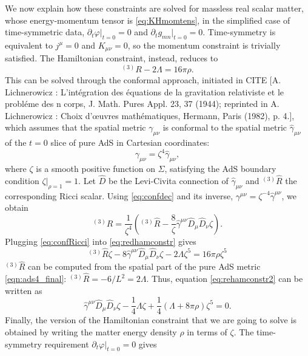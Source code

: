 \documentclass[a4paper,11pt]{article}
\numberwithin{equation}{section}
\begin{document}
We now explain how these constraints are solved for massless real scalar matter, whose energy-momentum tensor is \eqref{eq:KHmomtens}, in the simplified case of time-symmetric data, $\partial_t \varphi|_{t=0}=0$ and $\partial_t g_{mn}|_{t=0}=0$. Time-symmetry is equivalent to $j^\mu=0$ and $K_{\mu\nu}=0$, so the momentum constraint is trivially satisfied.
The Hamiltonian constraint, instead, reduces to
\begin{equation}
\label{eq:redhamconstr}
^{(3)}R-2\Lambda=16\pi\rho.
\end{equation}
This can be solved through the conformal approach, initiated in CITE [A. Lichnerowicz : L’int\'{e}gration des \'{e}quations de la gravitation relativiste et le probl\'{e}me des n corps, J. Math. Pures Appl. 23, 37 (1944); reprinted in A. Lichnerowicz : Choix d’œuvres math\'{e}matiques, Hermann, Paris (1982), p. 4.], which assumes that the spatial metric $\gamma_{\mu\nu}$ is conformal to the spatial metric $\hat{\gamma}_{\mu\nu}$ of the $t=0$ slice of pure AdS in Cartesian coordinates:
\begin{equation}
\label{eq:confdec}
\gamma_{\mu\nu}=\zeta^4 \hat{\gamma}_{\mu\nu},
\end{equation}
where $\zeta$ is a smooth positive function on $\Sigma$, satisfying the AdS boundary condition $\zeta|_{\rho=1}=1$. Let $\hat{D}$ be the Levi-Civita connection of $\hat{\gamma}_{\mu\nu}$ and $^{(3)}\hat{R}$ the corresponding Ricci scalar. Using  \eqref{eq:confdec} and its inverse, $\gamma^{\mu\nu}=\zeta^{-4} \hat{\gamma}^{\mu\nu}$, we obtain
\begin{equation}
\label{eq:confRicci}
^{(3)}R=\frac{1}{\zeta^4}\left(^{(3)}\hat{R}-\frac{8}{\zeta}\hat{\gamma}^{\mu\nu}\hat{D}_\mu \hat{D}_\nu \zeta\right).
\end{equation}
Plugging \eqref{eq:confRicci} into \eqref{eq:redhamconstr} gives
\begin{equation}
\label{eq:rehamconstr2}
^{(3)}\hat{R}\zeta-8\hat{\gamma}^{\mu\nu}\hat{D}_\mu \hat{D}_\nu \zeta-2\Lambda \zeta^5=16\pi\rho \zeta^5
\end{equation}
$^{(3)}\hat{R}$ can be computed from the spatial part of the pure AdS metric \eqref{eqn:ads4_final}: $^{(3)}\hat{R}=-6/L^2=2\Lambda$. Thus, equation \eqref{eq:rehamconstr2} can be written as
\begin{equation}
\label{eq:rehamconstr3}
\hat{\gamma}^{\mu\nu}\hat{D}_\mu \hat{D}_\nu \zeta-\frac{1}{4}\Lambda\zeta+\frac{1}{4}(\Lambda+8\pi\rho)\zeta^5=0.
\end{equation}
Finally, the version of the Hamiltonian constraint that we are going to solve is obtained by writing the matter energy density $\rho$ in terms of $\zeta$. The time-symmetry requirement $\partial_t \varphi|_{t=0}=0$ gives
\end{document}
